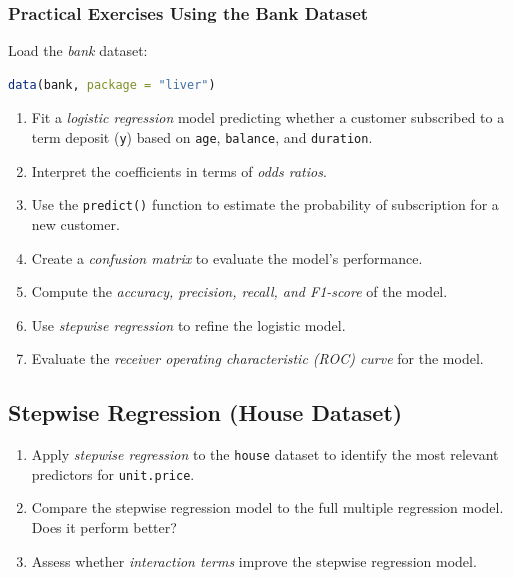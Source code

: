 \documentclass[
]{book}
\newcommand{\passthrough}[1]{#1}
\providecommand{\tightlist}{%
  \setlength{\itemsep}{0pt}\setlength{\parskip}{0pt}}
\theoremstyle{definition}
\theoremstyle{definition}
\theoremstyle{definition}
\theoremstyle{definition}
\theoremstyle{remark}
\begin{document}
\subsubsection*{Practical Exercises Using the Bank Dataset}\label{practical-exercises-using-the-bank-dataset}

Load the \emph{bank} dataset:

\begin{lstlisting}[language=R]
data(bank, package = "liver")
\end{lstlisting}

\begin{enumerate}
\def\labelenumi{\arabic{enumi}.}
\setcounter{enumi}{39}
\tightlist
\item
  Fit a \emph{logistic regression} model predicting whether a customer subscribed to a term deposit (\passthrough{\lstinline!y!}) based on \passthrough{\lstinline!age!}, \passthrough{\lstinline!balance!}, and \passthrough{\lstinline!duration!}.\\
\item
  Interpret the coefficients in terms of \emph{odds ratios}.\\
\item
  Use the \passthrough{\lstinline!predict()!} function to estimate the probability of subscription for a new customer.\\
\item
  Create a \emph{confusion matrix} to evaluate the model's performance.\\
\item
  Compute the \emph{accuracy, precision, recall, and F1-score} of the model.\\
\item
  Use \emph{stepwise regression} to refine the logistic model.\\
\item
  Evaluate the \emph{receiver operating characteristic (ROC) curve} for the model.
\end{enumerate}

\subsection*{Stepwise Regression (House Dataset)}\label{stepwise-regression-house-dataset}

\begin{enumerate}
\def\labelenumi{\arabic{enumi}.}
\setcounter{enumi}{46}
\tightlist
\item
  Apply \emph{stepwise regression} to the \passthrough{\lstinline!house!} dataset to identify the most relevant predictors for \passthrough{\lstinline!unit.price!}.\\
\item
  Compare the stepwise regression model to the full multiple regression model. Does it perform better?\\
\item
  Assess whether \emph{interaction terms} improve the stepwise regression model.
\end{enumerate}
\end{document}
